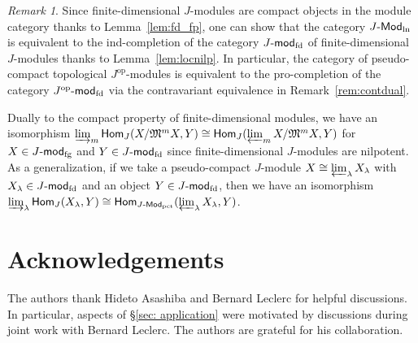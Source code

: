 \documentclass[12pt]{amsart}
\theoremstyle{definition}
\theoremstyle{remark}
\newtheorem{remark}[theorem]{Remark}
\numberwithin{equation}{section}
\newcommand{\opname}[1]{\operatorname{\mathsf{#1}}}
\newcommand{\Hom}{\opname{Hom}}
\newcommand{\modfg}{\mathchar`-\mathsf{mod}_{\mathrm{fg}}}
\newcommand{\op}{\mathrm{op}}
\newcommand{\fM}{\mathfrak{M}}
\newcommand{\Modln}{\mathchar`-\mathsf{Mod}_{\mathrm{ln}}}
\newcommand{\Modpct}{\mathchar`-\mathsf{Mod}_{\mathrm{pct}}}
\newcommand{\modfd}{\mathchar`-\mathsf{mod}_{\mathrm{fd}}}
\begin{document}
\begin{remark}
    Since finite-dimensional $J$-modules are compact objects in the module category thanks to Lemma~\ref{lem:fd_fp},
    one can show that the category $J\Modln$ is equivalent to the ind-completion of the category $J\modfd$ of finite-dimensional $J$-modules thanks to Lemma~\ref{lem:locnilp}. In particular, the category of pseudo-compact topological $J^\op$-modules is equivalent to the pro-completion of the category $J^\op\modfd$ via the contravariant equivalence in Remark~\ref{rem:contdual}.
    
    Dually to the compact property of finite-dimensional modules, we have an isomorphism $\varinjlim_m \Hom_J(X/\fM^m X, Y)\cong \Hom_{J}(\varprojlim_m X/\fM^m X, Y)$ for $X\in J\modfg$ and $Y\in J\modfd$ since finite-dimensional $J$-modules are nilpotent.
    As a generalization, if we take a pseudo-compact $J$-module $X\cong \varprojlim_\lambda X_\lambda$ with $X_\lambda\in J\modfd$ and an object $Y\in J\modfd$, then we have an isomorphism $\varinjlim_\lambda\Hom_J(X_\lambda, Y)\cong  \Hom_{J\Modpct}(\varprojlim_\lambda X_\lambda, Y)$.
\end{remark}
\section*{Acknowledgements}
The authors thank Hideto Asashiba and Bernard Leclerc for helpful discussions.
In particular, aspects of \S \ref{sec: application} were motivated by discussions during joint work with Bernard Leclerc. The authors are grateful for his collaboration.

\end{document}
